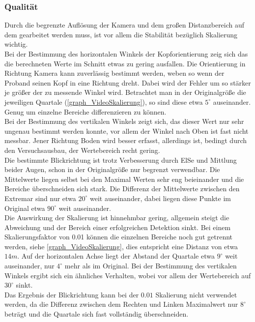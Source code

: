 \subsubsection{Qualität}
Durch die begrenzte Auflösung der Kamera und dem großen Distanzbereich auf dem gearbeitet werden muss, ist vor allem die Stabilität bezüglich Skalierung wichtig.\\
Bei der Bestimmung des horizontalen Winkels der Kopforientierung zeig sich das die berechneten Werte im Schnitt etwas zu gering ausfallen. Die Orientierung in Richtung Kamera kann zuverlässig bestimmt werden, weben so wenn der Proband seinen Kopf in eine Richtung dreht. Dabei wird der Fehler um so stärker je größer der zu messende Winkel wird. Betrachtet man in der Originalgröße die jeweiligen Quartale (\autoref{graph_VideoSkalierung}), so sind diese etwa $5^\circ$ auseinander. Genug um einzelne Bereiche differenzieren zu können.\\
Bei der Bestimmung des vertikalen Winkels zeigt sich, das dieser Wert nur sehr ungenau bestimmt werden konnte, vor allem der Winkel nach Oben ist fast nicht messbar. Jener Richtung Boden wird besser erfasst, allerdings ist, bedingt durch den Versuchsausbau, der Wertebereich recht gering.\\
Die bestimmte Blickrichtung ist trotz Verbesserung durch ElSe und Mittlung beider Augen, schon in der Originalgröße nur begrenzt verwendbar. Die Mittelwerte liegen selbst bei den Maximal Werten sehr eng beieinander und die Bereiche überschneiden sich stark. Die Differenz der Mittelwerte zwischen den Extremar sind nur etwa $20^\circ$ weit auseinander, dabei liegen diese Punkte im Original etwa $90^\circ$ weit auseinander.\\
Die Auswirkung der Skalierung ist hinnehmbar gering, allgemein steigt die Abweichung und der Bereich einer erfolgreichen Detektion sinkt. Bei einem Skalierungsfaktor von 0.01 können die einzelnen Bereiche noch gut getrennt werden, siehe \autoref{graph_VideoSkalierung}, dies entspricht eine Distanz von etwa $14m$. Auf der horizontalen Achse liegt der Abstand der Quartale etwa $9^\circ$ weit auseinander, nur $4^\circ$ mehr als im Original. Bei der Bestimmung des vertikalen Winkels ergibt sich ein ähnliches Verhalten, wobei vor allem der Wertebereich auf $30^\circ$ sinkt.\\
Das Ergebnis der Blickrichtung kann bei der $0.01$ Skalierung nicht verwendet werden, da die Differenz zwischen dem Rechten und Linken Maximalwert nur $8^\circ$ beträgt und die Quartale sich fast vollständig überschneiden.\\
